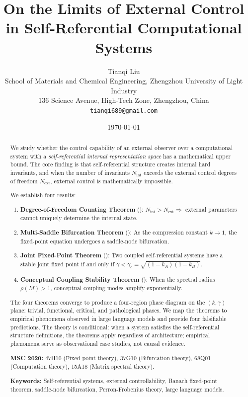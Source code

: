 \documentclass[12pt,a4paper]{article}
\title{On the Limits of External Control in Self-Referential Computational Systems}
\author{Tianqi Liu\\
School of Materials and Chemical Engineering, Zhengzhou University of Light Industry\\
136 Science Avenue, High-Tech Zone, Zhengzhou, China\\
\texttt{tianqi689@gmail.com}
}
\date{\today}
\theoremstyle{definition}
\newcommand{\Nint}{N_{\mathrm{int}}}
\newcommand{\Next}{N_{\mathrm{ext}}}
\newcommand{\gamc}{\gamma_c}
\begin{document}
\maketitle

\begin{abstract}
We study whether the control capability of an external observer over a computational system with a \emph{self-referential internal representation space} has a mathematical upper bound. The core finding is that self-referential structure creates internal hard invariants, and when the number of invariants $\Nint$ exceeds the external control degrees of freedom $\Next$, external control is mathematically impossible.

We establish four results:
\begin{enumerate}[leftmargin=*]
\item \textbf{Degree-of-Freedom Counting Theorem} (): $\Nint > \Next \Rightarrow$ external parameters cannot uniquely determine the internal state.
\item \textbf{Multi-Saddle Bifurcation Theorem} (): As the compression constant $k \to 1$, the fixed-point equation undergoes a saddle-node bifurcation.
\item \textbf{Joint Fixed-Point Theorem} (): Two coupled self-referential systems have a stable joint fixed point if and only if $\gamma < \gamc = \sqrt{(1-k_A)(1-k_B)}$.
\item \textbf{Conceptual Coupling Stability Theorem} (): When the spectral radius $\rho(M) > 1$, conceptual coupling modes amplify exponentially.
\end{enumerate}

The four theorems converge to produce a four-region phase diagram on the $(k, \gamma)$ plane: trivial, functional, critical, and pathological phases. We map the theorems to empirical phenomena observed in large language models and provide four falsifiable predictions. The theory is conditional: when a system satisfies the self-referential structure definitions, the theorems apply regardless of architecture; empirical phenomena serve as observational case studies, not causal evidence.

\medskip
\noindent\textbf{MSC 2020:} 47H10 (Fixed-point theory), 37G10 (Bifurcation theory), 68Q01 (Computation theory), 15A18 (Matrix spectral theory).

\medskip
\noindent\textbf{Keywords:} Self-referential systems, external controllability, Banach fixed-point theorem, saddle-node bifurcation, Perron-Frobenius theory, large language models.
\end{abstract}
\end{document}
